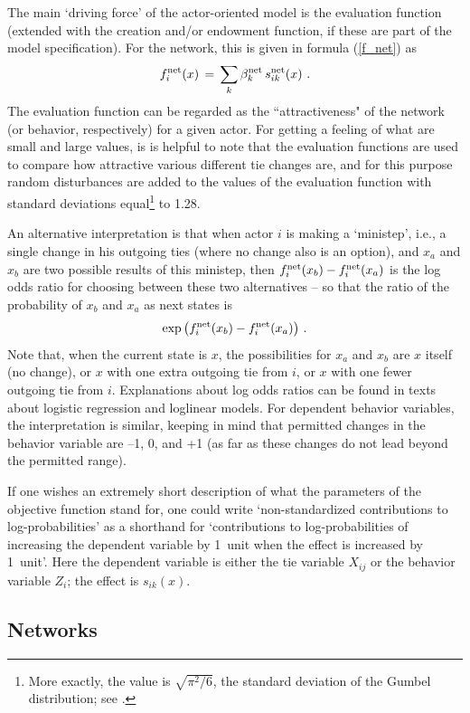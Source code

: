 \documentclass[a4paper,fleqn,11pt]{article}
\newcommand{\+}{\, + \,}
\begin{document}
The main `driving force' of the actor-oriented model
is the evaluation function
(extended with the creation and/or endowment function, if these are
part of the model specification).
For the network, this is given in formula (\ref{f_net}) as
\[
f^{\rm net}_i(x) \, = \, \sum_k \beta^{\rm net}_k \, s^{\rm net}_{ik}(x)   \ .
\]
The evaluation function can be regarded as the ``attractiveness"
of the network (or behavior, respectively) for a given actor.
For getting a feeling of what are small and large values,
is is helpful to note that the evaluation functions are
used to compare how attractive various different tie changes are,
and for this purpose random disturbances are added
to the values of the evaluation function with standard deviations
equal\footnote{More exactly, the value is $\sqrt{\pi^2/6}$,
the standard deviation of the Gumbel
distribution; see \citet{Snijders01}.} to 1.28.

An alternative interpretation is that when actor $i$ is making
a `ministep', i.e., a single change in his outgoing ties
(where no change also is an option), and
$x_a$ and $x_b$ are two possible results of this ministep,
then $f^{\rm net}_i(x_b) - f^{\rm net}_i(x_a)$ is the log odds ratio
for choosing between these two alternatives -- so that the ratio
of the probability of $x_b$ and $x_a$ as next states is
\[
  \exp\big(f^{\rm net}_i(x_b) - f^{\rm net}_i(x_a)\big) \ .
\]
Note that, when the current state is $x$, the possibilities
for $x_a$ and $x_b$ are $x$ itself (no change), or $x$ with one extra
outgoing tie from $i$, or $x$ with one fewer outgoing tie from $i$.
Explanations about log odds ratios can be found
in texts about logistic regression and loglinear models.
For dependent behavior variables, the interpretation is similar,
keeping in mind that permitted changes in the behavior variable are
--1, 0, and +1 (as far as these changes do not lead beyond the
permitted range).

If one wishes an extremely short description of what the parameters
of the objective function stand for, one could write
`non-standardized contributions to log-probabilities'
as a shorthand for
`contributions to log-probabilities of increasing the
dependent variable by 1~unit when the effect is increased by 1~unit'.
Here the dependent variable is either the tie variable $X_{ij}$
or the behavior variable $Z_i$; the effect is $s_{ik}(x)$.



\subsection{Networks}
\end{document}
